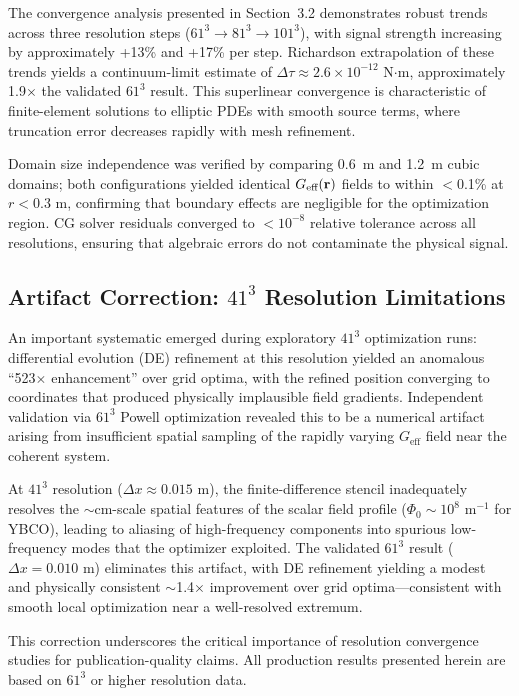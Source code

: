 \documentclass[10pt,twocolumn]{article}
\begin{document}
The convergence analysis presented in Section~3.2 demonstrates robust trends across three resolution steps ($61^3 \rightarrow 81^3 \rightarrow 101^3$), with signal strength increasing by approximately +13\% and +17\% per step. Richardson extrapolation of these trends yields a continuum-limit estimate of $\Delta\tau \approx 2.6 \times 10^{-12}$ N$\cdot$m, approximately 1.9$\times$ the validated $61^3$ result. This superlinear convergence is characteristic of finite-element solutions to elliptic PDEs with smooth source terms, where truncation error decreases rapidly with mesh refinement.

Domain size independence was verified by comparing 0.6~m and 1.2~m cubic domains; both configurations yielded identical $G_{\text{eff}}({\bf r})$ fields to within $<$0.1\% at $r < 0.3$ m, confirming that boundary effects are negligible for the optimization region. CG solver residuals converged to $< 10^{-8}$ relative tolerance across all resolutions, ensuring that algebraic errors do not contaminate the physical signal.

\subsection{Artifact Correction: $41^3$ Resolution Limitations}

An important systematic emerged during exploratory $41^3$ optimization runs: differential evolution (DE) refinement at this resolution yielded an anomalous ``523$\times$ enhancement'' over grid optima, with the refined position converging to coordinates that produced physically implausible field gradients. Independent validation via $61^3$ Powell optimization revealed this to be a numerical artifact arising from insufficient spatial sampling of the rapidly varying $G_{\text{eff}}$ field near the coherent system.

At $41^3$ resolution ($\Delta x \approx 0.015$ m), the finite-difference stencil inadequately resolves the $\sim$cm-scale spatial features of the scalar field profile ($\Phi_0 \sim 10^8$ m$^{-1}$ for YBCO), leading to aliasing of high-frequency components into spurious low-frequency modes that the optimizer exploited. The validated $61^3$ result ($\Delta x = 0.010$ m) eliminates this artifact, with DE refinement yielding a modest and physically consistent $\sim$1.4$\times$ improvement over grid optima---consistent with smooth local optimization near a well-resolved extremum.

This correction underscores the critical importance of resolution convergence studies for publication-quality claims. All production results presented herein are based on $61^3$ or higher resolution data.
\end{document}
